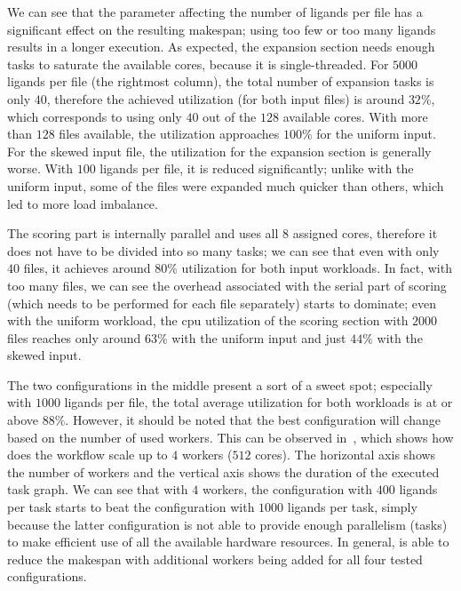 We can see that the parameter affecting the number of ligands per file has a significant effect on
the resulting makespan; using too few or too many ligands results in a longer execution. As
expected, the expansion section needs enough tasks to saturate the available cores, because it is
single-threaded. For $5000$ ligands per file (the rightmost column), the total
number of expansion tasks is only $40$, therefore the achieved utilization (for
both input files) is around $32\%$, which corresponds to using only
$40$ out of the $128$ available cores. With more than
$128$ files available, the utilization approaches $100\%$ for the
uniform input. For the skewed input file, the utilization for the expansion section is generally
worse. With $100$ ligands per file, it is reduced significantly; unlike with the
uniform input, some of the files were expanded much quicker than others, which led to more load
imbalance.

The scoring part is internally parallel and uses all $8$ assigned cores,
therefore it does not have to be divided into so many tasks; we can see that even with only
$40$ files, it achieves around $80\%$ utilization for both
input workloads. In fact, with too many files, we can see the overhead associated with the serial
part of scoring (which needs to be performed for each file separately) starts to dominate; even
with the uniform workload, the \gls{cpu} utilization of the scoring section with
$2000$ files reaches only around $63\%$ with the uniform input
and just $44\%$ with the skewed input.

The two configurations in the middle present a sort of a sweet spot; especially with
$1000$ ligands per file, the total average utilization for both workloads is at or
above $88\%$. However, it should be noted that the best configuration will change
based on the number of used workers. This can be observed in~, which shows
how does the workflow scale up to $4$ workers ($512$ cores).
The horizontal axis shows the number of workers and the vertical axis shows the duration of the
executed task graph. We can see that with $4$ workers, the configuration with
$400$ ligands per task starts to beat the configuration with
$1000$ ligands per task, simply because the latter configuration is not able to
provide enough parallelism (tasks) to make efficient use of all the available hardware resources.
In general, \hyperqueue{} is able to reduce the makespan with additional workers being
added for all four tested configurations.

